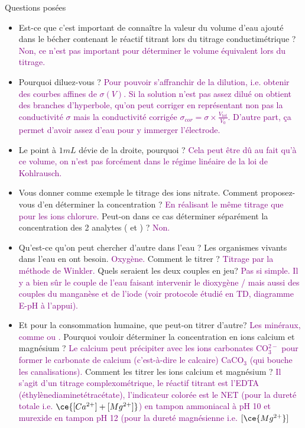 \begin{reportBlock}{Questions posées}

\begin{itemize}

\item Est-ce que c'est important de connaître la valeur du volume d'eau ajouté dans le bécher contenant le réactif titrant lors du titrage conductimétrique ? \textcolor{purple}{Non, ce n'est pas important pour déterminer le volume équivalent lors du titrage.}

\item Pourquoi diluez-vous ?  \textcolor{purple}{Pour pouvoir s'affranchir de la dilution, i.e. obtenir des courbes affines de $\sigma(V)$. Si la solution n'est pas assez dilué on obtient des branches d'hyperbole, qu'on peut corriger en représentant non pas la conductivité $\sigma$ mais la conductivité corrigée $\sigma_{cor}=\sigma \times \frac{V_{tot}}{V_0}$. D'autre part, ça permet d'avoir assez d'eau pour y immerger l'électrode.}

\item Le point à $1mL$ dévie de la droite, pourquoi ? \textcolor{purple}{Cela peut être dû au fait qu'à ce volume, on n'est pas forcément dans le régime linéaire de la loi de Kohlrausch.}

\item Vous donner comme exemple le titrage des ions nitrate. Comment proposez-vous d'en déterminer la concentration ? \textcolor{purple}{En réalisant le même titrage que pour les ions chlorure.} Peut-on dans ce cas déterminer séparément la concentration des 2 analytes ( et ) ? \textcolor{purple}{Non.}

\item Qu'est-ce qu'on peut chercher d'autre dans l'eau ? Les organismes vivants dans l'eau en ont besoin. \textcolor{purple}{Oxygène.} Comment le titrer ? \textcolor{purple}{Titrage par la méthode de Winkler.} Quels seraient les deux couples en jeu? \textcolor{purple}{Pas si simple. Il y a bien sûr le couple de l'eau faisant intervenir le dioxygène / mais aussi des couples du manganèse et de l'iode (voir protocole étudié en TD, diagramme E-pH à l'appui).}

\item Et pour la consommation humaine, que peut-on titrer d'autre? \textcolor{purple}{Les minéraux, comme  ou .} Pourquoi vouloir déterminer la concentration en ions calcium et magnésium ? \textcolor{purple}{Le calcium peut précipiter avec les ions carbonates CO$_{3}^{2-}$ pour former le carbonate de calcium (c'est-à-dire le calcaire) CaCO$_3$ (qui bouche les canalisations).} Comment les titrer les ions calcium et magnésium ? \textcolor{purple}{Il s'agit d'un titrage complexométrique, le réactif titrant est l'EDTA (éthylènediaminetétracétate), l'indicateur colorée est le NET (pour la dureté totale i.e. $\ce{[Ca^{2+}]+[Mg^{2+}]}$) en tampon ammoniacal à pH 10 et murexide en tampon pH 12 (pour la dureté magnésienne i.e. $[\ce{Mg^{2+}}]$}


\end{itemize}
\end{reportBlock}
